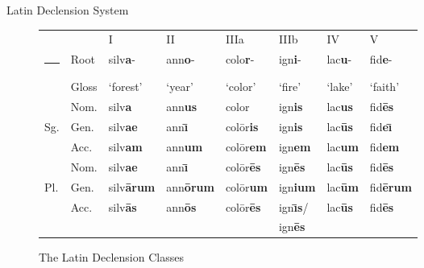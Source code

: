 \documentclass[final]{beamer}
\makeatletter
\newlength{\onecolwid}
\newcommand{\thickhline}{%
    \noalign {\ifnum 0=`}\fi \hrule height 1pt
    \futurelet \reserved@a \@xhline
}
\makeatother
\begin{document}
\begin{frame}[t]
\begin{columns}[t]
\begin{column}{\onecolwid}
\begin{block}{Latin Declension System}
\begin{figure}[h]
	\footnotesize
	\begin{tabular}{ll| llllll}
				&	&	I		&	II		&	IIIa		&	IIIb		&	IV		&	V	\\ \thickhline
		& Root		&	silv\textbf{a}-		&	ann\textbf{o}-	&	colo\textbf{r}-	&	ign\textbf{i}-		&	lac\textbf{u}-		&	fid\textbf{e}-	\\
		& Gloss		&	`forest'	&	`year'	&	`color'	&	`fire'		&	`lake'	&	`faith'	\\ \hline
		& Nom.	&	silv\textbf{a}		&	ann\textbf{us}&	color	&	ign\textbf{is}	&	lac\textbf{us} &	fid\textbf{\=es} \\
		Sg. & Gen.		&	silv\textbf{ae} 	&	ann\textbf{\=\i}&	col\=or\textbf{is}&	ign\textbf{is}	&	lac\textbf{\=us}&	fid\textbf{e\=\i} \\
		& Acc.		&	silv\textbf{am}	&	ann\textbf{um}&	col\=or\textbf{em}& ign\textbf{em}&	lac\textbf{um}&	fid\textbf{em}	\\  \hline
		& Nom.	&	silv\textbf{ae}		&	ann\textbf{\=\i}&	col\=or\textbf{\=es}& ign\textbf{\=es}&	lac\textbf{\=us}&	fid\textbf{\=es}		\\
		Pl. & Gen.		&	silv\textbf{\=arum} 	&	ann\textbf{\=orum}	&	col\=or\textbf{um}&ign\textbf{ium}& lac\textbf{\=um}&	fid\textbf{\=erum}\\
		& Acc.		&	silv\textbf{\=as}	&	ann\textbf{\=os}&	col\=or\textbf{\=es}&	ign\textbf{\=\i s}/&	lac\textbf{\=us}&	fid\textbf{\=es} \\
		&			&				&			&				&	ign\textbf{\=es}&		& \\		
	\end{tabular}
	\caption{The Latin Declension Classes}
	\label{fig:latdec}
\end{figure}


\end{block}
\end{column}
\end{columns}
\end{frame}
\end{document}
